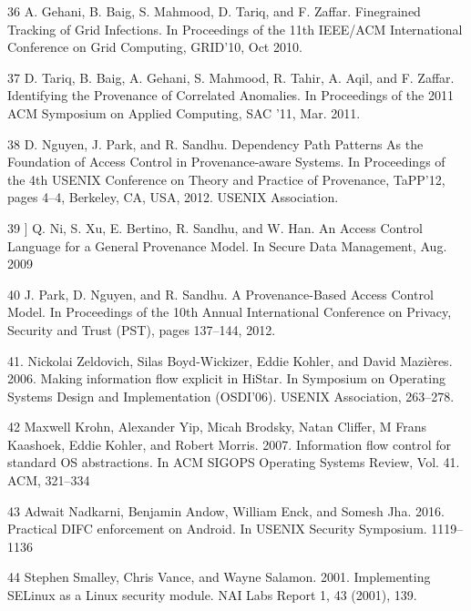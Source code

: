 \documentclass{IEEEtran}
\begin{document}
\begin{thebibliography}{00}
36 A. Gehani, B. Baig, S. Mahmood, D. Tariq, and F. Zaffar. Finegrained Tracking of Grid Infections. In Proceedings of the
11th IEEE/ACM International Conference on Grid Computing,
GRID’10, Oct 2010.

37 D. Tariq, B. Baig, A. Gehani, S. Mahmood, R. Tahir, A. Aqil, and
F. Zaffar. Identifying the Provenance of Correlated Anomalies. In
Proceedings of the 2011 ACM Symposium on Applied Computing,
SAC ’11, Mar. 2011.

38 D. Nguyen, J. Park, and R. Sandhu. Dependency Path Patterns
As the Foundation of Access Control in Provenance-aware Systems. In Proceedings of the 4th USENIX Conference on Theory
and Practice of Provenance, TaPP’12, pages 4–4, Berkeley, CA,
USA, 2012. USENIX Association.

39 ] Q. Ni, S. Xu, E. Bertino, R. Sandhu, and W. Han. An Access
Control Language for a General Provenance Model. In Secure
Data Management, Aug. 2009

40 J. Park, D. Nguyen, and R. Sandhu. A Provenance-Based Access
Control Model. In Proceedings of the 10th Annual International
Conference on Privacy, Security and Trust (PST), pages 137–144,
2012.

41. Nickolai Zeldovich, Silas Boyd-Wickizer, Eddie Kohler, and David Mazières.
2006. Making information flow explicit in HiStar. In Symposium on Operating
Systems Design and Implementation (OSDI’06). USENIX Association, 263–278.

42 Maxwell Krohn, Alexander Yip, Micah Brodsky, Natan Cliffer, M Frans Kaashoek,
Eddie Kohler, and Robert Morris. 2007. Information flow control for standard OS
abstractions. In ACM SIGOPS Operating Systems Review, Vol. 41. ACM, 321–334

43 Adwait Nadkarni, Benjamin Andow, William Enck, and Somesh Jha. 2016. Practical DIFC enforcement on Android. In USENIX Security Symposium. 1119–1136

44 Stephen Smalley, Chris Vance, and Wayne Salamon. 2001. Implementing SELinux
as a Linux security module. NAI Labs Report 1, 43 (2001), 139.
\end{thebibliography}
\end{document}
